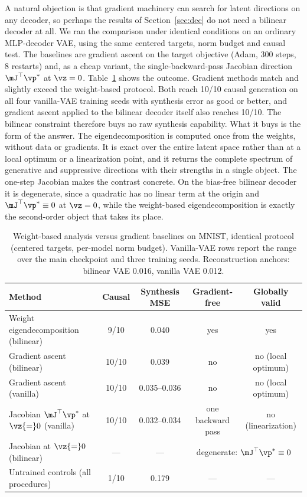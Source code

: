 \documentclass[10pt]{article} %
\begin{document}
A natural objection is that gradient machinery can search for latent directions on
any decoder, so perhaps the results of Section~\ref{sec:dec} do not need a bilinear
decoder at all. We ran the comparison under identical conditions on an ordinary
MLP-decoder VAE, using the same centered targets, norm budget and causal test. The
baselines are gradient ascent on the target objective (Adam, 300 steps, 8 restarts)
and, as a cheap variant, the single-backward-pass Jacobian direction
$\mJ^\top \vp^*$ at $\vz = 0$. Table~\ref{tab:jacobian} shows the outcome. Gradient
methods match and slightly exceed the weight-based protocol. Both reach 10/10
causal generation on all four vanilla-VAE training seeds with synthesis error as
good or better, and gradient ascent applied to the bilinear decoder itself also
reaches 10/10. The bilinear constraint therefore buys no raw synthesis capability.
What it buys is the form of the answer. The eigendecomposition is computed once
from the weights, without data or gradients. It is exact over the entire latent
space rather than at a local optimum or a linearization point, and it returns the
complete spectrum of generative and suppressive directions with their strengths in
a single object. The one-step Jacobian makes the contrast concrete. On the
bias-free bilinear decoder it is degenerate, since a quadratic has no linear term
at the origin and $\mJ^\top \vp^* \equiv 0$ at $\vz = 0$, while the weight-based
eigendecomposition is exactly the second-order object that takes its place.

\begin{table}[t]
\begin{center}
\small
\begin{tabular}{lcccc}
\toprule
Method & Causal & Synthesis MSE & Gradient-free & Globally valid \\
\midrule
Weight eigendecomposition (bilinear) & 9/10 & 0.040 & yes & yes \\
Gradient ascent (bilinear) & 10/10 & 0.039 & no & no (local optimum) \\
Gradient ascent (vanilla) & 10/10 & 0.035--0.036 & no & no (local optimum) \\
Jacobian $\mJ^\top\vp^*$ at $\vz{=}0$ (vanilla) & 10/10 & 0.032--0.034 & one backward pass & no (linearization) \\
Jacobian at $\vz{=}0$ (bilinear) & --- & --- & \multicolumn{2}{c}{degenerate: $\mJ^\top\vp^* \equiv 0$} \\
Untrained controls (all procedures) & 1/10 & 0.179 & --- & --- \\
\bottomrule
\end{tabular}
\end{center}
\caption{Weight-based analysis versus gradient baselines on MNIST, identical
protocol (centered targets, per-model norm budget). Vanilla-VAE rows report the
range over the main checkpoint and three training seeds. Reconstruction anchors:
bilinear VAE 0.016, vanilla VAE 0.012.}
\label{tab:jacobian}
\end{table}
\end{document}
